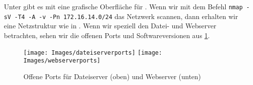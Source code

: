 Unter \Windows{} gibt es mit \Zenmap{} eine grafische Oberfläche für \Nmap{}. Wenn wir mit dem Befehl 
\lstinline{nmap -sV -T4 -A -v -Pn 172.16.14.0/24} das Netzwerk scannen, dann erhalten wir eine Netzstruktur wie in
 . Wenn wir speziell den Datei- und Webserver betrachten, sehen wir die offenen Ports und Softwareversionen aus \cref{fig:offeneports}.


\begin{figure}
 \centering
 \texttt{[image: Images/dateiserverports]}
 \texttt{[image: Images/webserverports]}
 \caption{Offene Ports für Dateiserver (oben) und Webserver (unten)}
 \label{fig:offeneports}
\end{figure}


